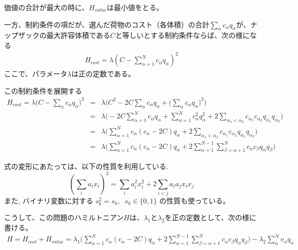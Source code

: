 \documentclass[uplatex,dvipdfmx,a4paper,11pt,oneside,openany]{jsbook}
\begin{document}
価値の合計が最大の時に、$H_{value}$は最小値をとる。

一方、制約条件の項だが、選んだ荷物のコスト（各体積）の合計$\sum_\alpha c_\alpha q_\alpha$が、ナップザックの最大許容体積である$C$と等しいとする制約条件ならば、次の様になる
\begin{eqnarray}
  H_{cost} = \lambda\left(C-\sum_{\alpha=1}^N c_\alpha q_\alpha\right)^2
\end{eqnarray}
ここで、パラメータ$\lambda$は正の定数である。

この制約条件を展開する
\begin{eqnarray*}
  H_{cost} = \lambda\bigg(C - \sum_\alpha c_\alpha q_\alpha\bigg)^2
  &=&\lambda\bigg(C^2 - 2C\sum_\alpha c_\alpha q_\alpha + \bigg(\sum_\alpha c_\alpha q_\alpha\bigg)^2\bigg)\\
  &=&\lambda\bigg(-2C\sum_{\alpha=1}^Nc_\alpha q_\alpha + \sum_{\alpha=1}^Nc_\alpha^2 q_\alpha^2 + 2\sum_{\alpha_1<\alpha_2}c_{\alpha_1}c_{\alpha_2}q_{\alpha_1}q_{\alpha_2}\bigg)\\
  &=&\lambda\bigg(\sum_{\alpha=1}^Nc_\alpha(c_\alpha-2C)q_\alpha + 2\sum_{\alpha_1<\alpha_2}c_{\alpha_1}c_{\alpha_2}q_{\alpha_1}q_{\alpha_2}\bigg)\\
&=&\lambda\bigg(\sum_{\alpha=1}^Nc_\alpha(c_\alpha-2C)q_\alpha+2\sum_{\alpha=1}^{N-1}\sum_{\beta=\alpha+1}^Nc_\alpha c_\beta q_\alpha q_\beta\bigg)
\end{eqnarray*}

\begin{screen}
式の変形にあたっては、以下の性質を利用している.
\[
\left(\sum_i a_i x_i\right)^2=\sum_i a_i^2 x_i^2 + 2\sum_{i<j}a_i a_j x_i x_j
\]
また, バイナリ変数に対する $s_k^2=s_k,\;\; s_k \in \{0, 1\}$ の性質も使っている。
\end{screen}

こうして、この問題のハミルトニアン$H$は、$\lambda_1$と$\lambda_2$を正の定数として、次の様に書ける。
\begin{eqnarray*}
  H = H_{cost} + H_{value} = \lambda_1\bigg(\sum_{\alpha=1}^Nc_\alpha(c_\alpha-2C)q_\alpha+2\sum_{\alpha=1}^{N-1}\sum_{\beta=\alpha+1}^Nc_\alpha c_\beta q_\alpha q_\beta\bigg) - \lambda_2\sum_\alpha^Nv_\alpha q_\alpha
\end{eqnarray*}
\end{document}
